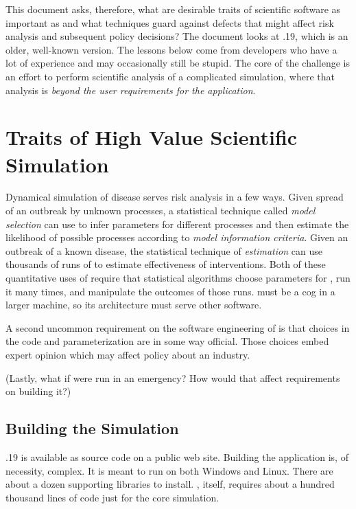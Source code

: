 \documentclass{article}
\begin{document}
This document asks, therefore, what are desirable traits
of scientific software as important as \naadsm and what techniques
guard against defects that might affect risk analysis and subsequent
policy decisions? The document looks at .19, which
is an older, well-known version. The lessons below come from
developers who have a lot of experience and may occasionally
still be stupid. The core of the challenge is an effort
to perform scientific analysis of a complicated simulation,
where that analysis is \emph{beyond the user requirements for
the application}.


\section{Traits of High Value Scientific Simulation}
Dynamical simulation of disease serves risk analysis in a few ways.
Given spread of an outbreak by unknown processes, a statistical
technique called \emph{model selection} can use \naadsm
to infer parameters for different processes and then estimate
the likelihood of possible processes according to \emph{model
information criteria}. Given an outbreak of a known disease,
the statistical technique of \emph{estimation} can use thousands
of runs of \naadsm to estimate effectiveness of interventions.
Both of these quantitative uses of \naadsm require that statistical
algorithms choose parameters for \naadsm, run it many times, and
manipulate the outcomes of those runs. \naadsm must be a cog
in a larger machine, so its architecture must serve other software.

A second uncommon requirement on the software engineering of
\naadsm is that choices in the code and parameterization
are in some way official. Those choices embed expert opinion
which may affect policy about an industry.

(Lastly, what if \naadsm were run in an emergency? How would
that affect requirements on building it?)


\subsection{Building the Simulation}
.19 is available as source code on a public web site.
Building the application is, of necessity, complex. It is meant
to run on both Windows and Linux. There are about a dozen
supporting libraries to install. \naadsm, itself, requires about
a hundred thousand lines of code just for the core simulation.
\end{document}
